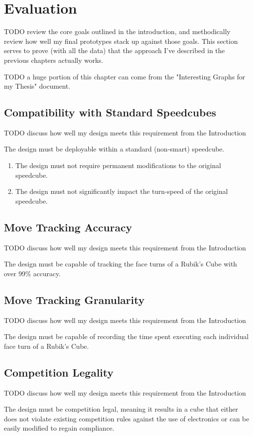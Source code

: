
\chapter{Evaluation} %

\label{Chapter7} %

TODO review the core goals outlined in the introduction, and methodically review how well my final prototypes stack up against those goals. This section serves to prove (with all the data) that the approach I've described in the previous chapters actually works.

TODO a huge portion of this chapter can come from the "Interesting Graphs for my Thesis" document.


\section{Compatibility with Standard Speedcubes}

TODO discuss how well my design meets this requirement from the Introduction

The design must be deployable within a standard (non-smart) speedcube.
\begin{enumerate} 
    \item The design must not require permanent modifications to the original speedcube.
    \item The design must not significantly impact the turn-speed of the original speedcube.
\end{enumerate}


\section{Move Tracking Accuracy}

TODO discuss how well my design meets this requirement from the Introduction

The design must be capable of tracking the face turns of a Rubik's Cube with over 99\% accuracy.


\section{Move Tracking Granularity}

TODO discuss how well my design meets this requirement from the Introduction

The design must be capable of recording the time spent executing each individual face turn of a Rubik's Cube.


\section{Competition Legality}

TODO discuss how well my design meets this requirement from the Introduction

The design must be competition legal, meaning it results in a cube that either does not violate existing competition rules against the use of electronics or can be easily modified to regain compliance.

